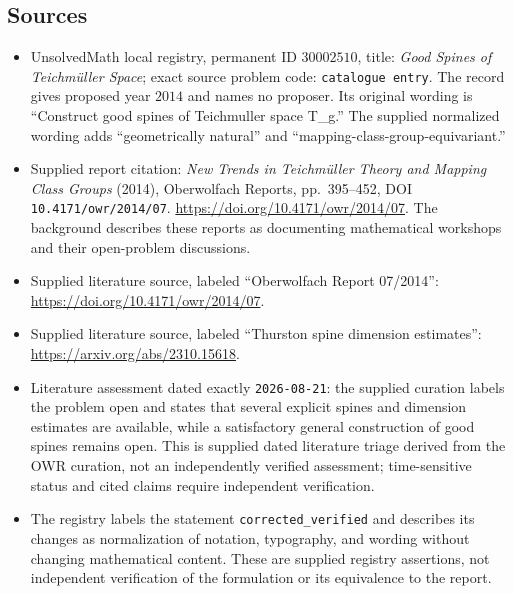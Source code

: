 \documentclass[11pt]{article}
\begin{document}
\subsection{Sources}
\begin{itemize}
\item UnsolvedMath local registry, permanent ID \(30002510\), title: \emph{Good Spines of Teichmüller Space}; exact source problem code: \texttt{catalogue entry}. The record gives proposed year \(2014\) and names no proposer. Its original wording is ``Construct good spines of Teichmuller space T\_g.'' The supplied normalized wording adds ``geometrically natural'' and ``mapping-class-group-equivariant.''
\item Supplied report citation: \emph{New Trends in Teichmüller Theory and Mapping Class Groups} (2014), Oberwolfach Reports, pp.\ 395--452, DOI \texttt{10.4171/owr/2014/07}. \url{https://doi.org/10.4171/owr/2014/07}. The background describes these reports as documenting mathematical workshops and their open-problem discussions.
\item Supplied literature source, labeled ``Oberwolfach Report 07/2014'': \url{https://doi.org/10.4171/owr/2014/07}.
\item Supplied literature source, labeled ``Thurston spine dimension estimates'': \url{https://arxiv.org/abs/2310.15618}.
\item Literature assessment dated exactly \texttt{2026-08-21}: the supplied curation labels the problem open and states that several explicit spines and dimension estimates are available, while a satisfactory general construction of good spines remains open. This is supplied dated literature triage derived from the OWR curation, not an independently verified assessment; time-sensitive status and cited claims require independent verification.
\item The registry labels the statement \texttt{corrected\_verified} and describes its changes as normalization of notation, typography, and wording without changing mathematical content. These are supplied registry assertions, not independent verification of the formulation or its equivalence to the report.
\end{itemize}
\end{document}
